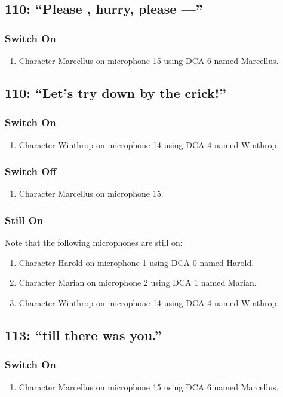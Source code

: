 \subsection* {110: ``Please , hurry, please ---''}
\subsubsection* {Switch On}
\begin{enumerate}
\item Character Marcellus on microphone 15 using DCA 6 named Marcellus.
\end{enumerate}
\subsection* {110: ``Let's try down by the crick!''}
\subsubsection* {Switch On}
\begin{enumerate}
\item Character Winthrop on microphone 14 using DCA 4 named Winthrop.
\end{enumerate}
\subsubsection* {Switch Off}
\begin{enumerate}
\item Character Marcellus on microphone 15.
\end{enumerate}
\subsubsection* {Still On}
Note that the following microphones are still on:
\begin{enumerate}
\item Character Harold on microphone 1 using DCA 0 named Harold.
\item Character Marian on microphone 2 using DCA 1 named Marian.
\item Character Winthrop on microphone 14 using DCA 4 named Winthrop.
\end{enumerate}
\subsection* {113: ``till there was you.''}
\subsubsection* {Switch On}
\begin{enumerate}
\item Character Marcellus on microphone 15 using DCA 6 named Marcellus.
\end{enumerate}

